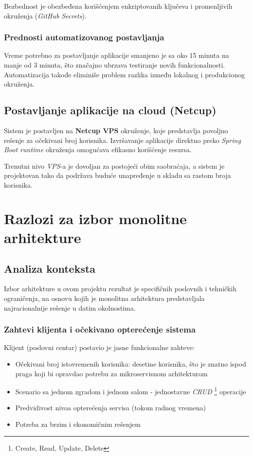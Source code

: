 \documentclass[12pt]{article}
\begin{document}
    Bezbednost je obezbeđena korišćenjem enkriptovanih ključeva i promenljivih okruženja (\textit{GitHub Secrets}).

    \subsubsection*{Prednosti automatizovanog postavljanja}

    Vreme potrebno za postavljanje aplikacije smanjeno je sa oko 15 minuta na manje od 3 minuta, 
    što značajno ubrzava testiranje novih funkcionalnosti. Automatizacija takođe eliminiše problem 
    razlika između lokalnog i produkcionog okruženja.

    \newpage

    \subsection{Postavljanje aplikacije na cloud (Netcup)}

    Sistem je postavljen na \textbf{Netcup VPS} okruženje, koje predstavlja povoljno rešenje za 
    očekivani broj korisnika. Izvršavanje aplikacije direktno 
    preko \textit{Spring Boot runtime} okruženja omogućava efikasno korišćenje resursa.

    Trenutni nivo \textit{VPS}-a je dovoljan za postojeći obim saobraćaja, 
    a sistem je projektovan tako da podržava buduće unapređenje u skladu sa rastom broja korisnika.

    \section{Razlozi za izbor monolitne arhitekture}

    \subsection{Analiza konteksta}

    Izbor arhitekture u ovom projektu rezultat je specifičnih poslovnih i tehničkih ograničenja, na osnovu kojih je monolitna arhitektura predstavljala najracionalnije rešenje u datim okolnostima.

    \subsubsection*{Zahtevi klijenta i očekivano opterećenje sistema}

    Klijent (poslovni centar) postavio je jasne funkcionalne zahteve:
    \begin{itemize}
    \item Očekivani broj istovremenih korisnika: desetine korisnika, što je znatno ispod praga koji bi opravdao potrebu za mikroservisnom arhitekturom
    \item Scenario sa jednom zgradom i jednom salom - jednostavne \textit{CRUD} \footnote{Create, Read, Update, Delete} operacije
    \item Predvidivost nivoa opterećenja servisa (tokom radnog vremena)
    \item Potreba za brzim i ekonomičnim rešenjem
    \end{itemize}
\end{document}
